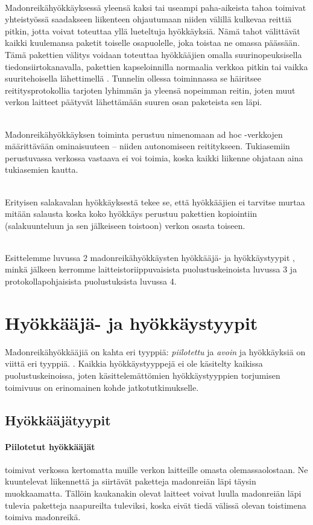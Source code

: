 \documentclass[finnish]{tktltiki2}
\theoremstyle{definition}
\theoremstyle{remark}
\begin{document}
\noindent \\
Madonreikähyökkäyksessä yleensä kaksi tai useampi paha-aikeista tahoa toimivat yhteistyössä saadakseen liikenteen ohjautumaan niiden välillä kulkevaa reittiä pitkin, jotta voivat toteuttaa yllä lueteltuja hyökkäyksiä. Nämä tahot välittävät kaikki kuulemansa paketit toiselle osapuolelle, joka toistaa ne omassa päässään. Tämä pakettien välitys voidaan toteuttaa hyökkääjien omalla suurinopeuksisella tiedonsiirtokanavalla, pakettien kapseloinnilla normaalia verkkoa pitkin tai vaikka suuritehoisella lähettimellä \cite{liteworp}. Tunnelin ollessa toiminnassa se häiritsee reititysprotokollia tarjoten lyhimmän ja yleensä nopeimman reitin, joten muut verkon laitteet päätyvät lähettämään suuren osan paketeista sen läpi. 

\noindent \\
Madonreikähyökkäyksen toiminta perustuu nimenomaan ad hoc -verkkojen määrittävään ominaisuuteen -- niiden autonomiseen reititykseen. Tukiasemiin perustuvassa verkossa vastaava ei voi toimia, koska kaikki liikenne ohjataan aina tukiasemien kautta.

\noindent \\
Erityisen salakavalan hyökkäyksestä tekee se, että hyökkääjien ei tarvitse murtaa mitään salausta koska koko hyökkäys perustuu pakettien kopiointiin (salakuunteluun ja sen jälkeiseen toistoon) verkon osasta toiseen.

\noindent \\
Esittelemme luvussa 2 madonreikähyökkäysten hyökkääjä- \cite{delphi} ja hyökkäystyypit \cite{liteworp}, minkä jälkeen kerromme laitteistoriippuvaisista puolustuskeinoista luvussa 3 ja protokollapohjaisista puolustuksista luvussa 4.


\section{Hyökkääjä- ja hyökkäystyypit}

Madonreikähyökkääjiä on kahta eri tyyppiä: \emph{piilotettu} ja \emph{avoin} \cite{delphi} ja hyökkäyksiä on viittä eri tyyppiä. \cite{liteworp}. Kaikkia hyökkäystyyppejä ei ole käsitelty kaikissa puolustuskeinoissa, joten käsittelemättömien hyökkäystyyppien torjumisen toimivuus on erinomainen kohde jatkotutkimukselle.

\subsection{Hyökkääjätyypit}
\paragraph{Piilotetut hyökkääjät} toimivat verkossa kertomatta muille verkon laitteille omasta olemassaolostaan. Ne kuuntelevat liikennettä ja siirtävät paketteja madonreiän läpi täysin muokkaamatta. Tällöin kaukanakin olevat laitteet voivat luulla madonreiän läpi tulevia paketteja naapureilta tuleviksi, koska eivät tiedä välissä olevan toistimena toimiva madonreikä.
\end{document}
